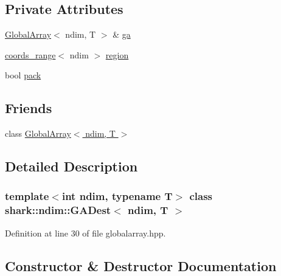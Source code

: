 \subsection*{Private Attributes}
\begin{DoxyCompactItemize}
\item 
\hyperlink{classshark_1_1ndim_1_1_global_array}{Global\+Array}$<$ ndim, T $>$ \& \hyperlink{classshark_1_1ndim_1_1_g_a_dest_aa64cb1bd1f2155c6cca997e4ba69760e}{ga}
\item 
\hyperlink{structshark_1_1ndim_1_1coords__range}{coords\+\_\+range}$<$ ndim $>$ \hyperlink{classshark_1_1ndim_1_1_g_a_dest_a13e2c3f9bc86ceec20bd4c98bf4699b2}{region}
\item 
bool \hyperlink{classshark_1_1ndim_1_1_g_a_dest_aeef6b8ca8d9d57db09b32949e0493aca}{pack}
\end{DoxyCompactItemize}
\subsection*{Friends}
\begin{DoxyCompactItemize}
\item 
class \hyperlink{classshark_1_1ndim_1_1_g_a_dest_ae56b9154646ac1569c81ea1215860995}{Global\+Array$<$ ndim, T $>$}
\end{DoxyCompactItemize}


\subsection{Detailed Description}
\subsubsection*{template$<$int ndim, typename T$>$\newline
class shark\+::ndim\+::\+G\+A\+Dest$<$ ndim, T $>$}



Definition at line 30 of file globalarray.\+hpp.



\subsection{Constructor \& Destructor Documentation}
\hypertarget{classshark_1_1ndim_1_1_g_a_dest_a5da867cbd42503f33eb5b824f18926af}{}\label{classshark_1_1ndim_1_1_g_a_dest_a5da867cbd42503f33eb5b824f18926af} 
